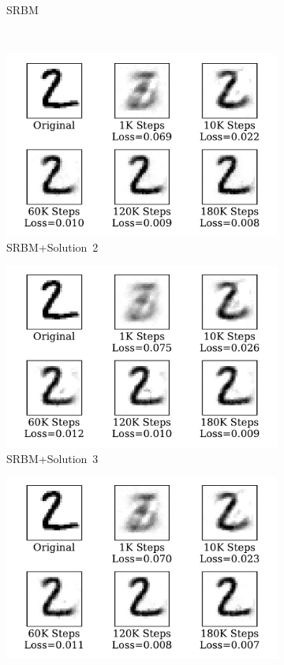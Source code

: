 \begin{figure}
\begin{subfigure}[t]{0.32\textwidth}
		\caption{SRBM}
	\end{subfigure}\\
	\begin{subfigure}[t]{0.32\textwidth}
		\includegraphics[width=\textwidth]{pics_sdlm/52_MNIST_SRBM_noise/recon_digit.pdf}
		\caption{SRBM+Solution~2}
	\end{subfigure}
	\begin{subfigure}[t]{0.32\textwidth}
		\includegraphics[width=\textwidth]{pics_sdlm/51_MNIST_SRBM_teach/recon_digit.pdf}
		\caption{SRBM+Solution~3}
	\end{subfigure}
	\begin{subfigure}[t]{0.32\textwidth}
		\includegraphics[width=\textwidth]{pics_sdlm/53_MNIST_SRBM_all/recon_digit.pdf}

\end{subfigure}
\end{figure}
